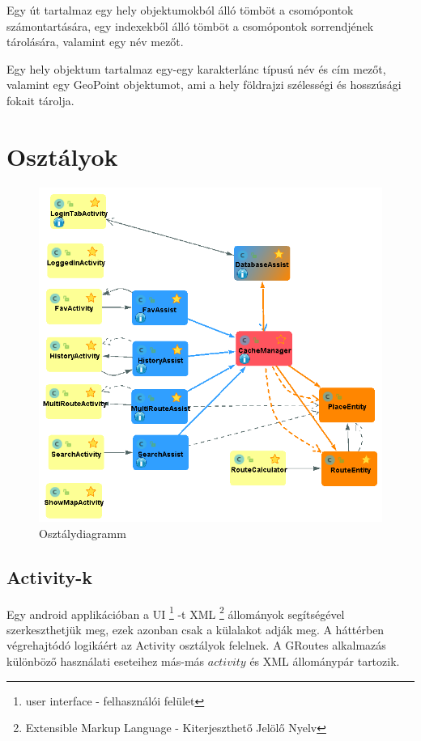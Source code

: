 Egy út tartalmaz egy hely objektumokból álló tömböt a csomópontok számontartására, egy indexekből álló tömböt a csomópontok sorrendjének tárolására, valamint egy név mezőt.

Egy hely objektum tartalmaz egy-egy karakterlánc típusú név és cím mezőt, valamint egy GeoPoint objektumot, ami a hely földrajzi szélességi és hosszúsági fokait tárolja.
 

\section{Osztályok}\label{sec:ALAP:adatelem}

\begin{figure}
	\centering
	\setlength{\abovecaptionskip}{-10pt}
	\setlength{\belowcaptionskip}{0pt}
	\includegraphics[width=1\textwidth]{images/class_diagram}
	\caption{Osztálydiagramm\label{fig:ALAP:sm2}}
\end{figure}

\subsection{Activity-k}\label{sec:ALAP:adatelem}

Egy android applikációban a UI%
\footnote{ %
	user interface - felhasználói felület
}  %
-t XML%
\footnote{ %
	Extensible Markup Language - Kiterjeszthető Jelölő Nyelv
}  %
állományok segítségével szerkeszthetjük meg, ezek azonban csak a külalakot adják meg. A háttérben végrehajtódó logikáért az Activity osztályok felelnek. A GRoutes alkalmazás különböző használati eseteihez más-más \(activity\) és XML állománypár tartozik.

